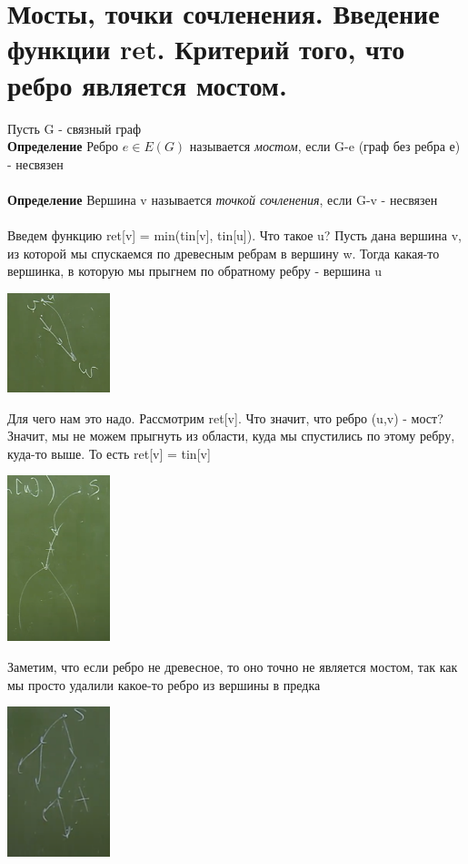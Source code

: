 \setcounter{section}{34}
\section{Мосты, точки сочленения. Введение функции ret. Критерий того, что ребро является мостом.}
Пусть G - связный граф\\
\textbf{Определение} Ребро $e \in E(G)$ называется \textit{мостом}, если G-e (граф без ребра е) - несвязен
\\
\\
\textbf{Определение} Вершина v называется \textit{точкой сочленения}, если G-v - несвязен
\\
\\
Введем функцию ret[v] = min(tin[v], tin[u]). Что такое u? Пусть дана вершина v, из которой мы спускаемся по древесным ребрам в вершину w. Тогда какая-то вершинка, в которую мы прыгнем по обратному ребру - вершина u
\begin{center}
    \includegraphics[width=3cm]{images/35-36_alg19.PNG}
\end{center}
Для чего нам это надо. Рассмотрим ret[v]. Что значит, что ребро (u,v) - мост? Значит, мы не можем прыгнуть из области, куда мы спустились по этому ребру, куда-то выше. То есть ret[v] = tin[v]
\\
\begin{center}
    \includegraphics[width=3cm]{images/35-36_algo20.PNG}    
\end{center}

Заметим, что если ребро не древесное, то оно точно не является мостом, так как мы просто удалили какое-то ребро из вершины в предка
\begin{center}
    \includegraphics[width=3cm]{images/35-36_alg21.PNG}    
\end{center}

